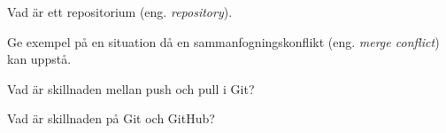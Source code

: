 \item Vad är ett repositorium (eng. \emph{repository}).
\qskip
\item Ge exempel på en situation då en sammanfogningskonflikt (eng. \emph{merge conflict}) kan uppstå.
\qskip
\item Vad är skillnaden mellan push och pull i Git?
\qskip
\item  Vad är skillnaden på Git och GitHub?

